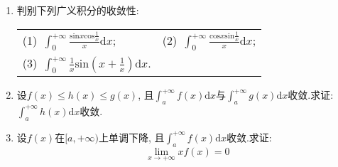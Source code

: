 \begin{enumerate}
\begin{table}[H]
\begin{tabular}{ll}
	\end{tabular}
\end{table}
\item 判别下列广义积分的收敛性:
\begin{table}[H]
	\begin{tabular}{ll}
		(1)\ $\displaystyle{\int_{0}^{+\infty}\frac{\mathrm{sin}x\mathrm{cos}\frac{1}{x}}{x}\mathrm{d}x}$;
		\qquad \qquad \qquad \qquad&(2)\ $\displaystyle{\int_{0}^{+\infty}\frac{\mathrm{cos}x\mathrm{sin}\frac{1}{x}}{x}\mathrm{d}x}$;\\
		(3)\  $\displaystyle{\int_{0}^{+\infty}\frac{1}{x}\mathrm{sin}(x+\frac{1}{x})\mathrm{d}x}$.
	\end{tabular}
\end{table}
\item 设$f(x)\le h(x)\le g(x)$, 且$\displaystyle{\int_{a}^{+\infty}f(x)\mathrm{d}x}$与$\displaystyle{\int_{a}^{+\infty}g(x)\mathrm{d}x}$收敛.求证: $\displaystyle{\int_{a}^{+\infty}h(x)\mathrm{d}x}$收敛.
\item 设$f(x)$在$[a,+\infty)$上单调下降, 且$\displaystyle{\int_{a}^{+\infty}f(x)\mathrm{d}x}$收敛.求证:
$$\lim\limits_{x\rightarrow +\infty}xf(x)=0$$

\end{enumerate}